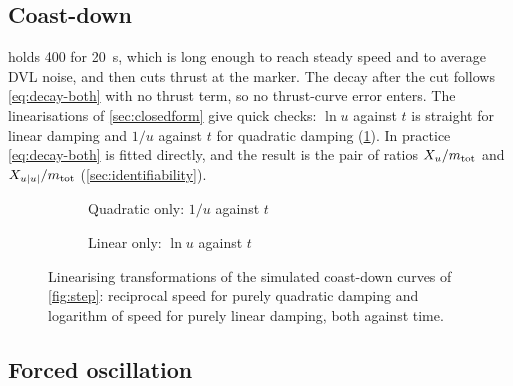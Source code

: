 \subsection{Coast-down}

 holds 400 for \qty{20}{\second}, which is long enough to reach steady speed and to
average DVL noise, and then cuts thrust at the  marker. The decay after the cut follows
\eqref{eq:decay-both} with no thrust term, so no thrust-curve error enters. The
linearisations of \cref{sec:closedform} give quick checks: $\ln u$ against $t$ is straight
for linear damping and $1/u$ against $t$ for quadratic damping (\cref{fig:coast-lin}). In
practice \eqref{eq:decay-both} is fitted directly, and the result is the pair of ratios
$X_u/m_\mathrm{tot}$ and $X_{u|u|}/m_\mathrm{tot}$ (\cref{sec:identifiability}).

\begin{figure}[htbp]
\centering
\begin{subfigure}{0.48\textwidth}
\centering
{}
\caption{Quadratic only: $1/u$ against $t$}
\end{subfigure}\hfill
\begin{subfigure}{0.48\textwidth}
\centering
{}
\caption{Linear only: $\ln u$ against $t$}
\end{subfigure}
\caption{Linearising transformations of the simulated coast-down curves of
\cref{fig:step}: reciprocal speed for purely quadratic damping and logarithm of speed for purely
linear damping, both against time.}
\label{fig:coast-lin}
\end{figure}
\FloatBarrier

\subsection{Forced oscillation}

